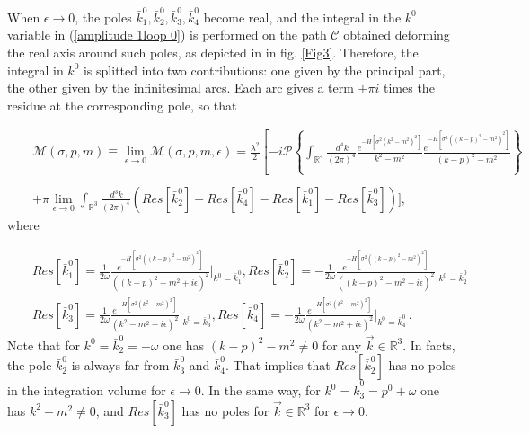 \documentclass[a4paper,11pt]{article}
\newcommand{\be}{\begin{eqnarray}}
\newcommand{\ee}{\end{eqnarray}}
\newcommand{\bea}{\begin{eqnarray}}
\begin{document}
When $\epsilon \rightarrow 0$, the poles $\bar{k}^0_1, \bar{k}^0_2,\bar{k}^0_3,\bar{k}^0_4$ become real, and the integral in the $k^0$ variable in (\ref{amplitude 1loop 0}) is performed on the path $\mathcal{C}$ obtained  deforming the real axis around such poles, 
as depicted in in fig. \ref{Fig3}. Therefore, the integral in $k^0$ is  splitted into two contributions: one given by the principal part, the other given by the  infinitesimal arcs. %
Each  arc gives a term $\pm \pi i$ times the residue at the corresponding pole, so that




\bea\label{amplitude 1loop 3}
&& \mathcal{M}(\sigma,p,m) \equiv \lim_{\epsilon \rightarrow 0} \mathcal{M}(\sigma,p,m,\epsilon)  =  \frac{ \lambda^2}{2}    \left[- i \mathcal{P}\left\{\int_{ \mathbb{R}^4} \frac{ \, d^4 k}{(2\pi)^4}
\frac{e^{-H\left[\sigma^2\left(k^2-m^2\right)^2\right]}}{k^2 - m^2} \frac{e^{-H\left[\sigma^2\left(\left(k-p\right)^2-m^2\right)^2\right]}}{(k-p)^2 - m^2 }\right\}
\right.\nonumber 
\\ \nonumber
\\ 
&&+\pi \lim_{\epsilon \rightarrow 0} \int_{ \mathbb{R}^3} \frac{ \, d^3 k}{(2\pi)^4}  \left( Res[\bar{k}^0_2]+Res[\bar{k}^0_4]-Res[\bar{k}^0_1]-Res[\bar{k}^0_3]     \right) \Bigg] ,
\ee
where


\be\label{residues}
&& Res[\bar{k}^0_1]= \frac{1}{2\omega}\frac{e^{-H\left[\sigma^2\left(\left(k-p\right)^2-m^2\right)^2\right]}}{\left(\left(k-p\right)^2-m^2+i \epsilon\right)^2}{\bigg|}_{k^0= \bar{k}^0_1}, Res[\bar{k}^0_2]= -\frac{1}{2\omega}\frac{e^{-H\left[\sigma^2\left(\left(k-p\right)^2-m^2\right)^2\right]}}{\left(\left(k-p\right)^2-m^2+i \epsilon\right)^2}{\bigg|}_{k^0= \bar{k}^0_2}\nonumber\\
&& Res[\bar{k}^0_3]= \frac{1}{2\omega}\frac{e^{-H\left[\sigma^2\left(k^2-m^2\right)^2\right]}}{\left(k^2-m^2+i \epsilon\right)^2}{\bigg|}_{k^0= \bar{k}^0_3}, Res[\bar{k}^0_4]= -\frac{1}{2\omega}\frac{e^{-H\left[\sigma^2\left(k^2-m^2\right)^2\right]}}{\left(k^2-m^2+i \epsilon\right)^2}{\bigg|}_{k^0= \bar{k}^0_4  } \, .
\ee
Note that for $k^0 = \bar{k}^0_2= - \omega$ one has $\left(k-p\right)^2-m^2 \neq 0$ for any $\vec{k}\in \mathbb{R}^3$. In facts, the pole $\bar{k}^0_2$ is always far from $\bar{k}^0_3$ and $\bar{k}^0_4$. That implies that $Res[\bar{k}^0_2]$ has no poles in the integration volume for $\epsilon\rightarrow 0$. In the same way, for $k^0 = \bar{k}^0_3= p^0+ \omega$ one has $k^2-m^2 \neq 0$, and $Res[\bar{k}^0_3]$ has no poles for $\vec{k}\in \mathbb{R}^3$ for $\epsilon\rightarrow 0$.
\end{document}

